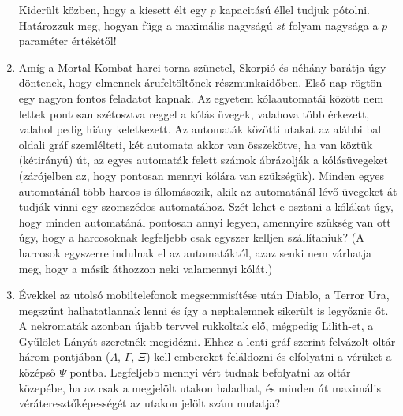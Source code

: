 \documentclass[a4paper, 12pt]{article}
\begin{document}
\begin{enumerate}
            Kiderült közben, hogy a kiesett élt egy $p$ kapacitású éllel tudjuk pótolni. Határozzuk meg, hogyan függ a maximális nagyságú  $st$ folyam nagysága a $p$ paraméter értékétől!

            \item %
            Amíg a Mortal Kombat harci torna szünetel, Skorpió és néhány barátja úgy döntenek, hogy elmennek árufeltöltőnek részmunkaidőben. Első nap rögtön egy nagyon fontos feladatot kapnak. Az egyetem kólaautomatái között nem lettek pontosan szétosztva reggel a kólás üvegek, valahova több érkezett, valahol pedig hiány keletkezett. Az automaták közötti utakat az alábbi bal oldali gráf szemlélteti, két automata akkor van összekötve, ha van köztük (kétirányú) út, az egyes automaták felett számok ábrázolják a kólásüvegeket (zárójelben az, hogy pontosan mennyi kólára van szükségük). Minden egyes automatánál több harcos is állomásozik, akik az automatánál lévő üvegeket át tudják vinni egy szomszédos automatához. Szét lehet-e osztani a kólákat úgy, hogy minden automatánál pontosan annyi legyen, amennyire szükség van ott úgy, hogy a harcosoknak legfeljebb csak egyszer kelljen szállítaniuk? (A harcosok egyszerre indulnak el az automatáktól, azaz senki nem várhatja meg, hogy a másik áthozzon neki valamennyi kólát.)
            \begin{figure}[!h]
                \centering
                    
            \end{figure}

            \item Évekkel az utolsó mobiltelefonok megsemmisítése után Diablo, a Terror Ura, megszűnt halhatatlannak lenni és így a nephalemnek sikerült is legyőznie őt. A nekromaták azonban újabb tervvel rukkoltak elő, mégpedig Lilith-et, a Gyűlölet Lányát szeretnék megidézni. Ehhez a lenti gráf szerint felvázolt oltár három pontjában ($\Lambda$, $\Gamma$, $\Xi$) kell embereket feláldozni és elfolyatni a vérüket a középső $\Psi$ pontba. Legfeljebb mennyi vért tudnak befolyatni az oltár közepébe, ha az csak a megjelölt utakon haladhat, és minden út maximális véráteresztőképességét az utakon jelölt szám mutatja?
            \begin{figure}[!ht]
                \centering
                
            \end{figure}
        \end{enumerate}
    
\end{document}
